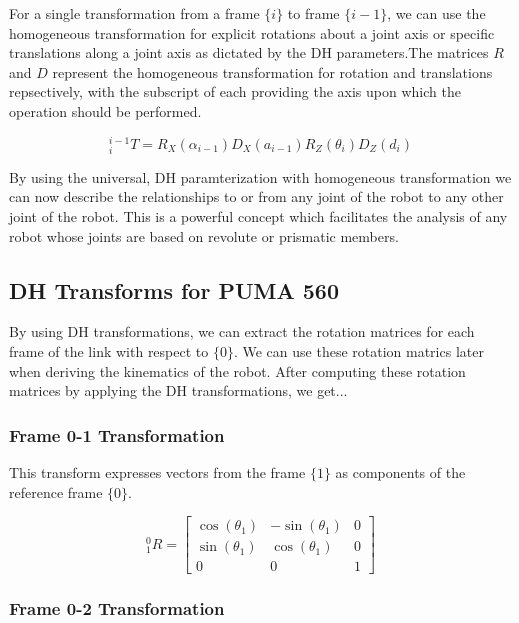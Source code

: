 \noindent For a single transformation from a frame $\{ i\}$ to frame $\{ i-1 \}$, we can use the homogeneous transformation for explicit rotations about a joint axis or specific translations along a joint axis as dictated by the DH parameters.The matrices $R$ and $D$ represent the homogeneous transformation for rotation and translations repsectively, with the subscript of each providing the axis upon which the operation should be performed.


$$
{ }_{i}^{i-1} T=R_{X}\left(\alpha_{i-1}\right) D_{X}\left(a_{i-1}\right) R_{Z}\left(\theta_{i}\right) D_{Z}\left(d_{i}\right)
$$


\noindent By using the universal, DH paramterization with homogeneous transformation we can now describe the relationships to or from any joint of the robot to any other joint of the robot. This is a powerful concept which facilitates the analysis of any robot whose joints are based on revolute or prismatic members.


\subsection*{DH Transforms for PUMA 560 }

By using DH transformations, we can extract the rotation matrices for each frame of the link with respect to $\{ 0 \}$. We can use these rotation matrics later when deriving the kinematics of the robot. After computing these rotation matrices by applying the DH transformations, we get...


\subsubsection*{Frame 0-1 Transformation}

This transform expresses vectors from the frame $\{ 1 \}$ as components of the reference frame $\{ 0 \}$.

$$
{}^{0}_{1}R = \left[\begin{array}{cccc} \cos\left(\theta _{1}\right) & -\sin\left(\theta _{1}\right) & 0 \\ \sin\left(\theta _{1}\right) & \cos\left(\theta _{1}\right) & 0 \\ 0 & 0 & 1 \end{array}\right]
$$

\subsubsection*{Frame 0-2 Transformation}

